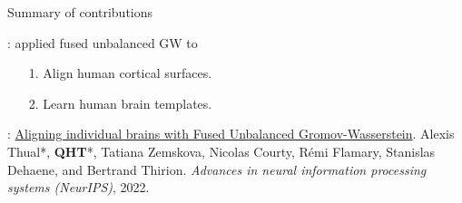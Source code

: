 \documentclass{beamer}
\begin{document}
\begin{frame}{Summary of contributions}
  \scriptsize


  \vspace{5cm}
  {}: applied fused unbalanced GW to
  \begin{enumerate}
    \setlength\itemindent{10pt}
    \item[1.] Align human cortical surfaces.
    \item[2.] Learn human brain templates.
  \end{enumerate}

  \vspace{0.3cm}
  {}: \ul{Aligning individual brains with Fused Unbalanced Gromov-Wasserstein}.
  Alexis Thual*, \textbf{QHT}*, Tatiana Zemskova, Nicolas Courty,
  Rémi Flamary, Stanislas Dehaene, and Bertrand Thirion.
  \textit{Advances in neural information processing systems (NeurIPS)}, 2022.

\end{frame}
\end{document}
